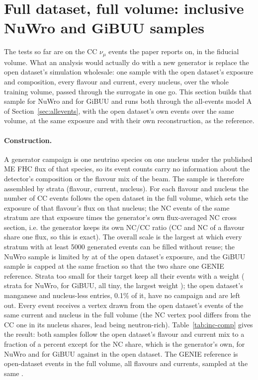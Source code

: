 \documentclass[11pt]{article}
\begin{document}
\FloatBarrier

\section{Full dataset, full volume: inclusive NuWro and GiBUU samples}
\label{sec:inclusive}

The tests so far are on the CC $\nu_\mu$ events the paper reports on, in the fiducial volume. What an analysis
would actually do with a new generator is replace the open dataset's simulation wholesale: one
sample with the open dataset's exposure and composition, every flavour and current, every nucleus, over the whole
training volume, passed through the surrogate in one go. This section builds that sample for NuWro and for GiBUU
and runs both through the all-events model A of Section~\ref{sec:allevents}, with the open dataset's own events
over the same volume, at the same exposure and with their own reconstruction, as the reference.

\paragraph{Construction.} A generator campaign is one neutrino species on one nucleus under the published ME FHC
flux of that species, so its event counts carry no information about the detector's composition or the flavour
mix of the beam. The sample is therefore assembled by strata (flavour, current, nucleus). For each flavour and
nucleus the number of CC events follows the open dataset in the full volume, which sets the exposure of that
flavour's flux on that nucleus; the NC events of the same stratum are that exposure times the generator's own
flux-averaged NC cross section, i.e. the generator keeps its own NC/CC ratio (CC and NC of a flavour share one
flux, so this is exact). The overall scale is the largest at which every stratum with at least 5000 generated
events can be filled without reuse; the NuWro sample is limited by \nIncNuwLimit{} at \nIncFrac{} of the open
dataset's exposure, and the GiBUU sample is capped at the same fraction so that the two share one GENIE reference.
Strata too small for their target keep all their events with a weight (\nIncNuwWeighted{} strata for NuWro,
\nIncGibWeighted{} for GiBUU, all tiny, the largest weight \nIncNuwMaxW{}); the open dataset's manganese and
nucleus-less entries, 0.1\% of it, have no campaign and are left out. Every event receives a vertex drawn from the
open dataset's events of the same current and nucleus in the full volume (the NC vertex pool differs from the CC
one in its nucleus shares, lead being neutron-rich). Table~\ref{tab:inc-comp} gives the result: both samples
follow the open dataset's flavour and current mix to a fraction of a percent except for the NC share, which is
the generator's own, \nIncNuwNC{} for NuWro and \nIncGibNC{} for GiBUU against \nIncOpenNC{} in the open dataset.
The GENIE reference is \nIncOpenAll{} open-dataset events in the full volume, all flavours and currents, sampled
at the same \nIncFrac{}.
\end{document}
